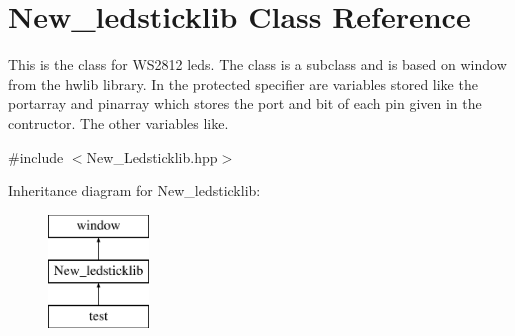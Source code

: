 \hypertarget{class_new__ledsticklib}{}\section{New\+\_\+ledsticklib Class Reference}
\label{class_new__ledsticklib}


This is the class for W\+S2812 leds. The class is a subclass and is based on window from the hwlib library. In the protected specifier are variables stored like the portarray and pinarray which stores the port and bit of each pin given in the contructor. The other variables like.  




{\ttfamily \#include $<$New\+\_\+\+Ledsticklib.\+hpp$>$}

Inheritance diagram for New\+\_\+ledsticklib\+:\begin{figure}[H]
\begin{center}
\leavevmode
\includegraphics[height=3.000000cm]{class_new__ledsticklib}
\end{center}
\end{figure}
